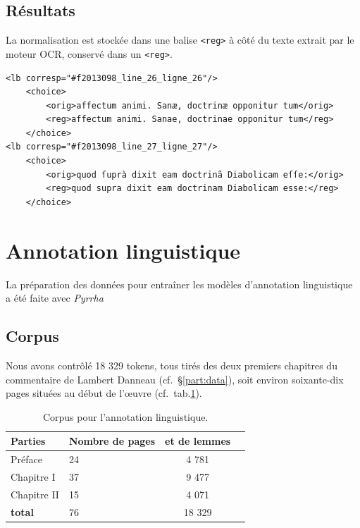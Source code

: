 \documentclass[11pt,french]{article}
\begin{document}
\subsection{Résultats}

La normalisation est stockée dans une balise \texttt{<reg>} à côté du texte extrait par le moteur OCR, conservé dans un \texttt{<reg>}.

\begin{verbatim}
<lb corresp="#f2013098_line_26_ligne_26"/>
    <choice>
        <orig>affectum animi. Sanæ, doctrinæ opponitur tum</orig>
        <reg>affectum animi. Sanae, doctrinae opponitur tum</reg>
    </choice>
<lb corresp="#f2013098_line_27_ligne_27"/>
    <choice>
        <orig>quod ſuprà dixit eam doctrinã Diabolicam eſſe:</orig>
        <reg>quod supra dixit eam doctrinam Diabolicam esse:</reg>
    </choice>
\end{verbatim}

\section{Annotation linguistique}
\label{sec:Lemmatisation}
La préparation des données pour entraîner les modèles d'annotation linguistique a été faite avec \textit{Pyrrha} \citep{clerice_building_2022}

\subsection{Corpus}

Nous avons contrôlé 18 329 tokens, tous tirés des deux premiers chapitres du commentaire de Lambert Danneau (cf.~\S\ref{part:data}), soit environ soixante-dix pages situées au début de l'œuvre (cf.~tab.\ref{tab:annotation}).

\begin{table}[h]
    \centering\small
    \begin{tabular}{l l c c}
        \toprule
        \textbf{Parties} & \textbf{Nombre de pages} & \textbf{et de lemmes} \\
        \midrule
        Préface & 24 & 4 781 \\
        Chapitre I & 37 & 9 477 \\
        Chapitre II & 15 & 4 071 \\
        \toprule
        \textbf{total} & 76 & 18 329 \\
        \bottomrule
    \end{tabular}
    \caption{Corpus pour l'annotation linguistique.}
    \label{tab:annotation}
    \end{table}
\end{document}
